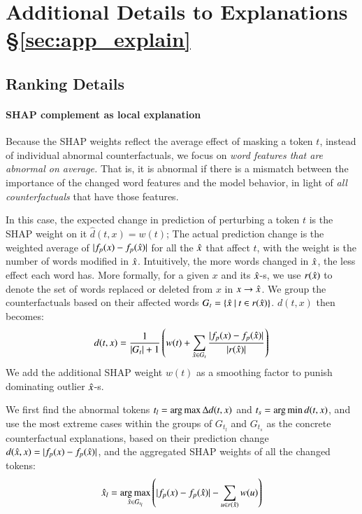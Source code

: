\section{Additional Details to Explanations \S\ref{sec:app_explain}}
\label{appendix:explanation}


\subsection{Ranking Details}



\paragraph{SHAP complement as local explanation}
Because the SHAP weights reflect the average effect of masking a token $t$, instead of individual abnormal counterfactuals, we focus on \emph{word features that are abnormal on average.}
That is, it is abnormal if there is a mismatch between the importance of the changed word features and the model behavior, in light of \emph{all counterfactuals} that have those features.

In this case, the expected change in prediction of perturbing a token $t$ is the SHAP weight on it $\hat{d}(t, x) = w(t)$; The actual prediction change is the weighted average of $|f_p(x)-f_p(\hat{x})|$ for all the $\hat{x}$ that affect $t$, with the weight is the number of words modified in $\hat{x}$. 
Intuitively, the more words changed in $\hat{x}$, the less effect each word has.
More formally, for a given $x$ and its $\hat{x}$-s, we use $r(\hat{x})$ to denote the set of words replaced or deleted from $x$ in $x \rightarrow \hat{x}$.
We group the counterfactuals based on their affected words $G_t = \{\hat{x}\ |\ t \in r(\hat{x})\}$. $d(t, x)$ then becomes:
$$d(t, x) = \frac{1}{|G_t|+1} \left(w(t) + \sum_{\hat{x} \in G_t} \frac{|f_p(x)-f_p(\hat{x})|}{|r(\hat{x})|}\right)$$
We add the additional SHAP weight $w(t)$ as a smoothing factor to punish dominating outlier $\hat{x}$-s.

We first find the abnormal tokens $t_l = \operatorname*{arg\,max} \Delta d(t, x)$ and $t_s = \operatorname*{arg\,min} d(t, x)$, and use the most extreme cases within the groups of $G_{t_l}$ and $G_{t_s}$ as the concrete counterfactual explanations, based on their prediction change $d(\hat{x}, x) = |f_p(x)-f_p(\hat{x})|$, and the aggregated SHAP weights of all the changed tokens:
$$\hat{x}_l = \operatorname*{arg\,max}_{\hat{x} \in G_{t_l}} \left( |f_p(x)-f_p(\hat{x})| - \sum_{u\in r(\hat{x})} w(u) \right)$$ 



